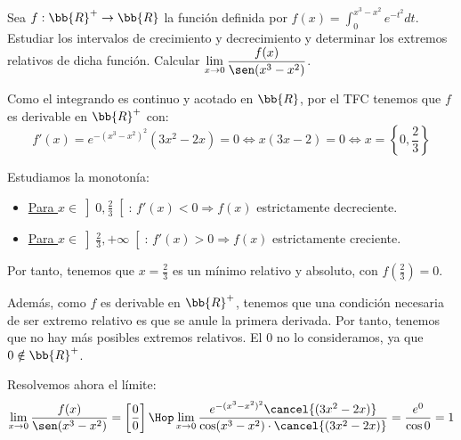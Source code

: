 \begin{ejercicio}
    Sea $f:\bb{R}^+\to \bb{R}$ la función definida por $f(x)=\int_0^{x^3-x^2}e^{-t^2} dt$. Estudiar los intervalos de crecimiento y decrecimiento y determinar los extremos relativos de dicha función. Calcular $\displaystyle \lim_{x\to 0}\frac{f(x)}{\sen(x^3-x^2)}$.

    Como el integrando es continuo y acotado en $\bb{R}$, por el TFC tenemos que $f$ es derivable en $\bb{R}^+$ con:
    \begin{equation*}
        f'(x)=e^{-(x^3-x^2)^2} (3x^2-2x) = 0 \Longleftrightarrow x(3x-2)=0 \Longleftrightarrow x=\left\{0,\frac{2}{3}\right\}
    \end{equation*}

    Estudiamos la monotonía:
    \begin{itemize}
        \item \underline{Para $x\in \left]0, \frac{2}{3}\right[$}: $f'(x)<0\Longrightarrow f(x)$ estrictamente decreciente.
        \item \underline{Para $x\in \left]\frac{2}{3},+\infty\right[$}: $f'(x)>0\Longrightarrow f(x)$ estrictamente creciente.
    \end{itemize}

    Por tanto, tenemos que $x=\frac{2}{3}$ es un mínimo relativo y absoluto, con $f\left(\frac{2}{3}\right)=0$.
    
    Además, como $f$ es derivable en $\bb{R}^+$, tenemos que una condición necesaria de ser extremo relativo es que se anule la primera derivada. Por tanto, tenemos que no hay más posibles extremos relativos. El 0 no lo consideramos, ya que $0\notin \bb{R}^+$.

    \vspace{1cm}Resolvemos ahora el límite:
    \begin{equation*}
        \lim_{x\to 0}\frac{f(x)}{\sen(x^3-x^2)} = \left[\frac{0}{0}\right] \Hop
        \lim_{x\to 0}\frac{e^{-(x^3-x^2)^2} \cancel{(3x^2-2x)}}{\cos(x^3-x^2)\cdot \cancel{(3x^2-2x)}} = \frac{e^0}{\cos 0} = 1
    \end{equation*}
    
\end{ejercicio}


